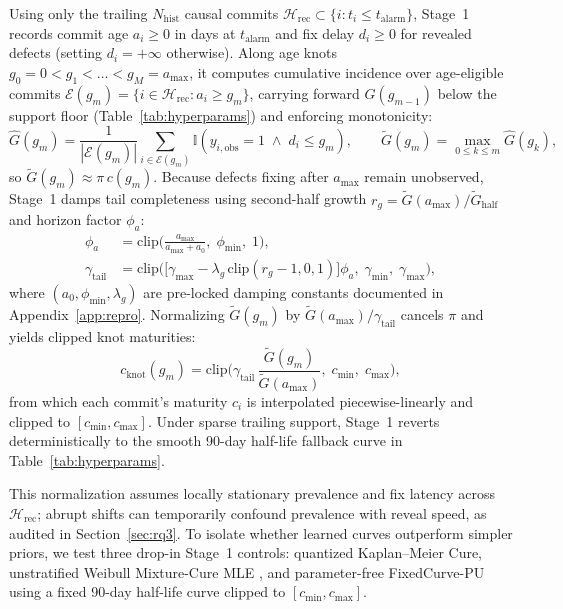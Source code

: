 \documentclass[pdflatex,sn-basic]{sn-jnl}
\theoremstyle{definition}
\theoremstyle{plain}
\begin{document}
Using only the trailing $N_{\text{hist}}$ causal commits $\mathcal{H}_{\text{rec}} \subset \{i : t_i \le t_{\text{alarm}}\}$, Stage~1 records commit age $a_i \ge 0$ in days at $t_{\text{alarm}}$ and fix delay $d_i \ge 0$ for revealed defects (setting $d_i = +\infty$ otherwise). Along age knots $g_0 = 0 < g_1 < \dots < g_M = a_{\max}$, it computes cumulative incidence over age-eligible commits $\mathcal{E}(g_m) = \{i \in \mathcal{H}_{\text{rec}} : a_i \ge g_m\}$, carrying forward $\hat{G}(g_{m-1})$ below the support floor (Table~\ref{tab:hyperparams}) and enforcing monotonicity:
\begin{equation}
  \hat{G}(g_m) = \frac{1}{|\mathcal{E}(g_m)|}\sum_{i \in \mathcal{E}(g_m)} \mathbb{I}\!\left(y_{i,\text{obs}} = 1 \;\wedge\; d_i \le g_m\right), \qquad \tilde{G}(g_m) = \max_{0 \le k \le m}\hat{G}(g_k),
  \label{eq:cohort_inc}
\end{equation}
so $\tilde{G}(g_m) \approx \pi\, c(g_m)$. Because defects fixing after $a_{\max}$ remain unobserved, Stage~1 damps tail completeness using second-half growth $r_g = \tilde{G}(a_{\max}) / \tilde{G}_{\text{half}}$ and horizon factor $\phi_a$:
\begin{equation}
  \begin{aligned}
    \phi_a &= \mathrm{clip}\!\Big(\frac{a_{\max}}{a_{\max} + a_0},\; \phi_{\min},\; 1\Big), \\
    \gamma_{\text{tail}} &= \mathrm{clip}\!\Big(\big[\gamma_{\max} - \lambda_g\,\mathrm{clip}(r_g - 1, 0, 1)\big]\phi_a,\; \gamma_{\min},\; \gamma_{\max}\Big),
  \end{aligned}
  \label{eq:tail_cap}
\end{equation}
where $(a_0, \phi_{\min}, \lambda_g)$ are pre-locked damping constants documented in Appendix~\ref{app:repro}. Normalizing $\tilde{G}(g_m)$ by $\tilde{G}(a_{\max}) / \gamma_{\text{tail}}$ cancels $\pi$ and yields clipped knot maturities:
\begin{equation}
  c_{\text{knot}}(g_m) = \mathrm{clip}\!\Big(\gamma_{\text{tail}}\,\frac{\tilde{G}(g_m)}{\tilde{G}(a_{\max})},\; c_{\min},\; c_{\max}\Big),
  \label{eq:ci_interp}
\end{equation}
from which each commit's maturity $c_i$ is interpolated piecewise-linearly and clipped to $[c_{\min}, c_{\max}]$. Under sparse trailing support, Stage~1 reverts deterministically to the smooth 90-day half-life fallback curve in Table~\ref{tab:hyperparams}.

This normalization assumes locally stationary prevalence and fix latency across $\mathcal{H}_{\text{rec}}$; abrupt shifts can temporarily confound prevalence with reveal speed, as audited in Section~\ref{sec:rq3}. To isolate whether learned curves outperform simpler priors, we test three drop-in Stage~1 controls: quantized Kaplan--Meier Cure, unstratified Weibull Mixture-Cure MLE \citep{boag1949cure,farewell1982cure}, and parameter-free FixedCurve-PU using a fixed 90-day half-life curve clipped to $[c_{\min}, c_{\max}]$.
\end{document}
